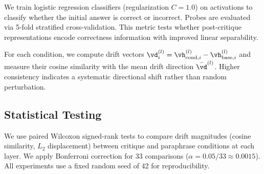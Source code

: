 We train logistic regression classifiers (regularization $C = 1.0$) on activations to classify whether the initial answer is correct or incorrect. Probes are evaluated via 5-fold stratified cross-validation. This metric tests whether post-critique representations encode correctness information with improved linear separability.

For each condition, we compute drift vectors $\vd^{(l)}_i = \vh^{(l)}_{\text{cond},i} - \vh^{(l)}_{\text{base},i}$ and measure their cosine similarity with the mean drift direction $\bar{\vd}^{(l)}$. Higher consistency indicates a systematic directional shift rather than random perturbation.

\subsection{Statistical Testing}

We use paired Wilcoxon signed-rank tests to compare drift magnitudes (cosine similarity, $L_2$ displacement) between critique and paraphrase conditions at each layer. We apply Bonferroni correction for 33 comparisons ($\alpha = 0.05/33 \approx 0.0015$). All experiments use a fixed random seed of 42 for reproducibility.
